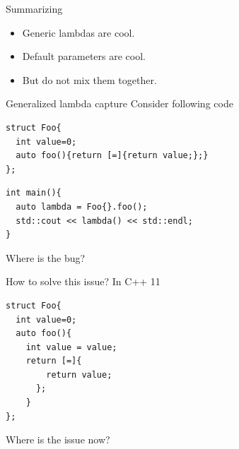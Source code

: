 \documentclass[10pt]{beamer}
\begin{document}

\begin{frame}{Summarizing}
	\begin{itemize}[<+- |alert@+>]
	\item Generic lambdas are cool.
	\item Default parameters are cool.
	\item But do not mix them together.
	\end{itemize}
\end{frame}

\begin{frame}[fragile]{Generalized lambda capture}
	\centering Consider following code

	\begin{verbatim}
struct Foo{
  int value=0;
  auto foo(){return [=]{return value;};}
};
	\end{verbatim}

	\pause

	\begin{verbatim}
int main(){
  auto lambda = Foo{}.foo();
  std::cout << lambda() << std::endl;
}
	\end{verbatim}

	\pause

\centering \alert{Where is the bug?}

\end{frame}

\begin{frame}[fragile]{How to solve this issue?}
	\centering \alert{In C++ 11}

	\begin{verbatim}
struct Foo{
  int value=0;
  auto foo(){
    int value = value;
    return [=]{
        return value;
      };
    }
};
	\end{verbatim}

	\pause
	\vfill
	\centering \alert{Where is the issue now?} 
\end{frame}
\end{document}
